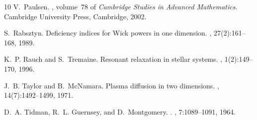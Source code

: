 \documentclass[a4paper,11pt,reqno,noindent]{amsart}
\theoremstyle{plain}
\numberwithin{equation}{section}
\newcommand{\3}{|\!|\!|}
\begin{document}
\begin{thebibliography}{10}
V.~Paulsen.
, volume~78 of
  {\em Cambridge Studies in Advanced Mathematics}.
\newblock Cambridge University Press, Cambridge, 2002.

S.~Rabsztyn.
\newblock Deficiency indices for {W}ick powers in one dimension.
, 27(2):161--168, 1989.

K.~P. Rauch and S.~Tremaine.
\newblock Resonant relaxation in stellar systems.
, 1(2):149--170, 1996.

J.~B. Taylor and B.~McNamara.
\newblock Plasma diffusion in two dimensions.
, 14(7):1492--1499, 1971.

D.~A. Tidman, R.~L. Guernsey, and D.~Montgomery.
.
, 7:1089--1091, 1964.

\end{thebibliography}
\end{document}
